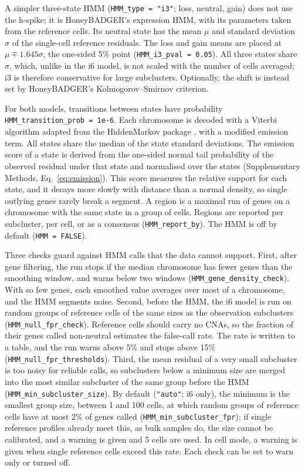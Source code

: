 
A simpler three-state HMM (\texttt{HMM\_type\ =\ "i3"}; loss, neutral, gain) does not use the h-spike; it is HoneyBADGER's expression HMM, with its parameters taken from the reference cells. Its neutral state has the mean $\mu$ and standard deviation $\sigma$ of the single-cell reference residuals. The loss and gain means are placed at $\mu \mp 1.645\sigma$, the one-sided 5\% point (\texttt{HMM\_i3\_pval\ =\ 0.05}). All three states share $\sigma$, which, unlike in the i6 model, is not scaled with the number of cells averaged; i3 is therefore conservative for large subclusters. Optionally, the shift is instead set by HoneyBADGER's Kolmogorov--Smirnov criterion.

For both models, transitions between states have probability \texttt{HMM\_transition\_prob\ =\ 1e-6}. Each chromosome is decoded with a Viterbi algorithm adapted from the HiddenMarkov package \citep{hiddenmarkov}, with a modified emission term. All states share the median of the state standard deviations. The emission score of a state is derived from the one-sided normal tail probability of the observed residual under that state and normalised over the states (Supplementary Methods, Eq.~\ref{eq:emission}). This score measures the relative support for each state, and it decays more slowly with distance than a normal density, so single outlying genes rarely break a segment. A region is a maximal run of genes on a chromosome with the same state in a group of cells. Regions are reported per subcluster, per cell, or as a consensus (\texttt{HMM\_report\_by}). The HMM is off by default (\texttt{HMM\ =\ FALSE}).

Three checks guard against HMM calls that the data cannot support. First, after gene filtering, the run stops if the median chromosome has fewer genes than the smoothing window, and warns below two windows (\texttt{HMM\_gene\_density\_check}). With so few genes, each smoothed value averages over most of a chromosome, and the HMM segments noise. Second, before the HMM, the i6 model is run on random groups of reference cells of the same sizes as the observation subclusters (\texttt{HMM\_null\_fpr\_check}). Reference cells should carry no CNAs, so the fraction of their genes called non-neutral estimates the false-call rate. The rate is written to a table, and the run warns above 5\% and stops above 15\% (\texttt{HMM\_null\_fpr\_thresholds}). Third, the mean residual of a very small subcluster is too noisy for reliable calls, so subclusters below a minimum size are merged into the most similar subcluster of the same group before the HMM (\texttt{HMM\_min\_subcluster\_size}). By default (\texttt{"auto"}; i6 only), the minimum is the smallest group size, between 1 and 100 cells, at which random groups of reference cells have at most 2\% of genes called (\texttt{HMM\_min\_subcluster\_fpr}); if single reference profiles already meet this, as bulk samples do, the size cannot be calibrated, and a warning is given and 5 cells are used. In cell mode, a warning is given when single reference cells exceed this rate. Each check can be set to warn only or turned off.

